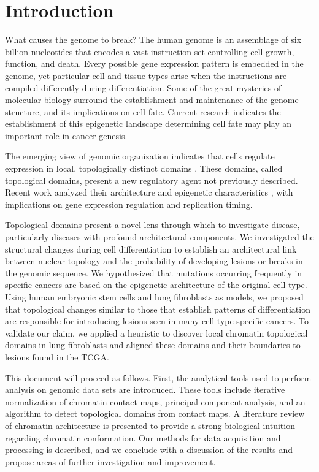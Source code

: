 
\chapter{Introduction}

What causes the genome to break?  The human genome is an assemblage of six billion nucleotides that encodes a vast instruction set
controlling cell growth, function, and death.  Every possible gene expression pattern is embedded in the genome, yet particular
cell and tissue types arise when the instructions are compiled differently during differentiation.  Some of the great mysteries
of molecular biology surround the establishment and maintenance of the genome structure, and its implications on cell fate. 
Current research indicates the establishment of this \gls{epigenetic} landscape determining cell fate may play an important
role in cancer genesis.

The emerging view of genomic organization indicates that cells regulate expression in local, topologically distinct domains
\citep{guelen2008,dixon2012,pope2014}.  These domains, called topological domains, present a new regulatory agent not
previously described.  Recent work analyzed their architecture \citep{imakaev2012} and epigenetic characteristics
\citep{dixon2012, pope2014}, with implications on gene expression regulation and replication timing.

Topological domains present a novel lens through which to investigate disease, particularly diseases with profound architectural components.
We investigated the structural changes during cell differentiation to establish an architectural link between
nuclear topology and the probability of developing lesions or breaks in the genomic sequence.  We hypothesized that mutations
occurring frequently in specific cancers are based on the epigenetic architecture of the original cell type.  Using human
embryonic stem cells and lung fibroblasts as models, we proposed that topological changes similar to those that establish
patterns of differentiation are responsible for introducing lesions seen in many cell type specific cancers.  To validate our
claim, we applied a heuristic to discover local chromatin topological domains in lung fibroblasts and aligned these domains and
their boundaries to lesions found in the \gls{TCGA}.

This document will proceed as follows.  First, the analytical tools used to perform analysis on genomic data sets are introduced.
These tools include iterative normalization of chromatin contact maps, principal component analysis, and an algorithm to detect
topological domains from contact maps.  A literature review of chromatin architecture is presented to
provide a strong biological intuition regarding chromatin conformation.  Our methods for data acquisition and processing is
described, and we conclude with a discussion of the results and propose areas of further investigation and improvement.
